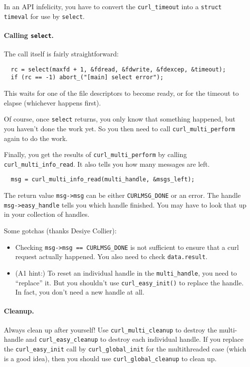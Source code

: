 \documentclass[11pt]{article}
\begin{document}
In an API infelicity, you have to convert the {\tt curl\_timeout} into a
{\tt struct timeval} for use by {\tt select}.

\paragraph{Calling {\tt select}.}
The call itself is fairly straightforward:
\begin{lstlisting}
  rc = select(maxfd + 1, &fdread, &fdwrite, &fdexcep, &timeout);
  if (rc == -1) abort_("[main] select error");
\end{lstlisting}
This waits for one of the file descriptors to become ready, or for the
timeout to elapse (whichever happens first).

Of course, once {\tt select} returns, you only know that something
happened, but you haven't done the work yet. So you then need to call
{\tt curl\_multi\_perform} again to do the work.

Finally, you get the results of {\tt curl\_multi\_perform} by calling
{\tt curl\_multi\_info\_read}. It also tells you how many messages are left.
\begin{lstlisting}
  msg = curl_multi_info_read(multi_handle, &msgs_left);
\end{lstlisting}
The return value \verb+msg->msg+ can be either {\tt CURLMSG\_DONE} or an error.
The handle \verb+msg->easy_handle+ tells you which handle finished. You may have
to look that up in your collection of handles.

Some gotchas (thanks Desiye Collier):
\begin{itemize}
\item Checking \verb+msg->msg == CURLMSG_DONE+ is not sufficient to ensure that a curl request actually happened. You also need to check {\tt data.result}.
\item (A1 hint:) To reset an individual handle in the {\tt multi\_handle}, you need to ``replace'' it. But you shouldn't use {\tt curl\_easy\_init()} to replace the handle.  In fact, you don't need a new handle at all.
\end{itemize}

\paragraph{Cleanup.} Always clean up after yourself! Use {\tt curl\_multi\_cleanup}
to destroy the multi-handle and {\tt curl\_easy\_cleanup} to destroy each individual handle. If you replace the {\tt curl\_easy\_init} call by {\tt curl\_global\_init} for the multithreaded case (which is a good idea), then you should use {\tt curl\_global\_cleanup} to clean up.
\end{document}
